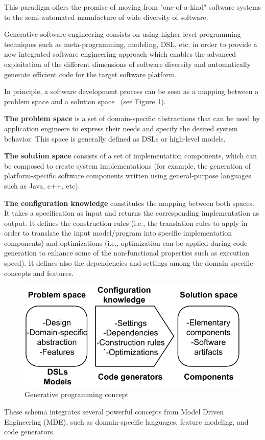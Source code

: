 This paradigm offers the promise of moving from "one-of-a-kind" software systems to the semi-automated manufacture of wide diversity of software.

Generative software engineering consists on using higher-level programming techniques such as meta-programming, modeling, DSL, etc. in order to provide a new integrated software engineering approach which enables the advanced exploitation of the different dimensions of software diversity and automatically generate efficient code for the target software platform. 

In principle, a software development process can be seen as a mapping between a problem space and a solution space~\cite{czarnecki2005overview} (see Figure \ref{fig:GDM}). 

\textbf{The problem space} is a set of domain-specific abstractions that can be used by application engineers to express their needs and specify the desired system behavior. This space is generally defined  as DSLs or high-level models. 

\textbf{The solution space} consists of a set of implementation components, which can be composed to create system implementations (for example, the generation of platform-specific software components written using general-purpose languages such as Java, c++, etc).

\textbf{The configuration knowledge} constitutes the mapping between both spaces. It takes a specification as input and returns the corresponding implementation as output. It defines the construction rules (i.e., the translation rules to apply in order to translate the input model/program into specific implementation components) and optimizations (i.e., optimization can be applied during code generation to enhance some of the non-functional properties such as execution speed). It defines also the dependencies and settings among the domain specific concepts and features.

\begin{figure}[h]
	\center
	\includegraphics[scale=0.65]{Background/fig/GDM.pdf}
	\caption{Generative programming concept}
	\label{fig:GDM}
\end{figure}
These schema integrates several powerful concepts from Model Driven Engineering (MDE), such as domain-specific languages, feature modeling, and code generators.

